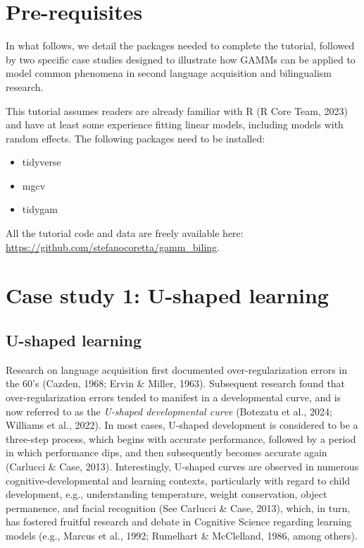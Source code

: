 \documentclass[
  letterpaper,
  DIV=11,
  numbers=noendperiod]{scrartcl}
\begin{document}
\section{Pre-requisites}\label{pre-requisites}

In what follows, we detail the packages needed to complete the tutorial,
followed by two specific case studies designed to illustrate how GAMMs
can be applied to model common phenomena in second language acquisition
and bilingualism research.

This tutorial assumes readers are already familiar with R (R Core Team,
2023) and have at least some experience fitting linear models, including
models with random effects. The following packages need to be installed:

\begin{itemize}
\item
  tidyverse
\item
  mgcv
\item
  tidygam
\end{itemize}

All the tutorial code and data are freely available here:
\url{https://github.com/stefanocoretta/gamm_biling}.

\section{Case study 1: U-shaped
learning}\label{case-study-1-u-shaped-learning}

\subsection{U-shaped learning}\label{u-shaped-learning}

Research on language acquisition first documented over-regularization
errors in the 60's (Cazden, 1968; Ervin \& Miller, 1963). Subsequent
research found that over-regularization errors tended to manifest in a
developmental curve, and is now referred to as the \emph{U-shaped
developmental curve} (Botezatu et al., 2024; Williams et al., 2022). In
most cases, U-shaped development is considered to be a three-step
process, which begins with accurate performance, followed by a period in
which performance dips, and then subsequently becomes accurate again
(Carlucci \& Case, 2013). Interestingly, U-shaped curves are observed in
numerous cognitive-developmental and learning contexts, particularly
with regard to child development, e.g., understanding temperature,
weight conservation, object permanence, and facial recognition (See
Carlucci \& Case, 2013), which, in turn, has fostered fruitful research
and debate in Cognitive Science regarding learning models (e.g., Marcus
et al., 1992; Rumelhart \& McClelland, 1986, among others).
\end{document}

